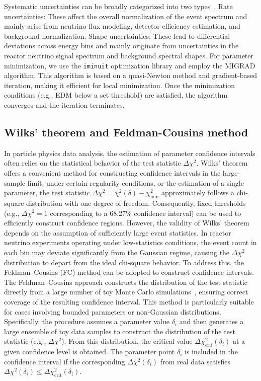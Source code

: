 \documentclass[xetex,twocolumn,epjc3]{svjour3}
\begin{document}
Systematic uncertainties can be broadly categorized into two types~\cite{Zhang2023theta13},
Rate uncertainties: These affect the overall normalization of the event spectrum and mainly arise from neutrino flux modeling, detector efficiency estimation, and background normalization.   
Shape uncertainties: These lead to differential deviations across energy bins and mainly originate from uncertainties in the reactor neutrino signal spectrum and background spectral shapes.
For parameter minimization, we use the \texttt{iminuit} optimization library and employ the MIGRAD algorithm. This algorithm is based on a quasi-Newton method and gradient-based iteration, making it efficient for local minimization. Once the minimization conditions (e.g., EDM below a set threshold) are satisfied, the algorithm converges and the iteration terminates.

\subsection{Wilks' theorem and Feldman-Cousins method}
\label{sec:statistical method}
In particle physics data analysis, the estimation of parameter confidence intervals often relies on the statistical behavior of the test statistic $\Delta \chi^2$. Wilks’ theorem~\cite{Wilks1938} offers a convenient method for constructing confidence intervals in the large-sample limit: under certain regularity conditions, or the estimation of a single parameter, the test statistic $\Delta \chi^2 = \chi^2(\delta) - \chi^2_{\min}$ approximately follows a chi-square distribution with one degree of freedom. Consequently, fixed thresholds (e.g., $\Delta \chi^2 = 1$ corresponding to a 68.27\% confidence interval) can be used to efficiently construct confidence regions.
However, the validity of Wilks’ theorem depends on the assumption of sufficiently large event statistics. In reactor neutrino experiments operating under low-statistics conditions, the event count in each bin may deviate significantly from the Gaussian regime, causing the $\Delta \chi^2$ distribution to depart from the ideal chi-square behavior. To address this, the Feldman–Cousins (FC) method can be adopted to construct confidence intervals.
The Feldman–Cousins approach constructs the distribution of the test statistic directly from a large number of toy Monte Carlo simulations~\cite{Feldman_1998}, ensuring correct coverage of the resulting confidence interval. This method is particularly suitable for cases involving bounded parameters or non-Gaussian distributions. Specifically, the procedure assumes a parameter value $\delta_i$ and then generates a large ensemble of toy data samples to construct the distribution of the test statistic (e.g., $\Delta \chi^2$). From this distribution, the critical value $\Delta \chi^2_{\text{crit}}(\delta_i)$ at a given confidence level is obtained. The parameter point $\delta_i$ is included in the confidence interval if the corresponding $\Delta \chi^2(\delta_i)$ from real data satisfies $\Delta \chi^2(\delta_i) \leq \Delta \chi^2_{\text{crit}}(\delta_i)$.
\end{document}
